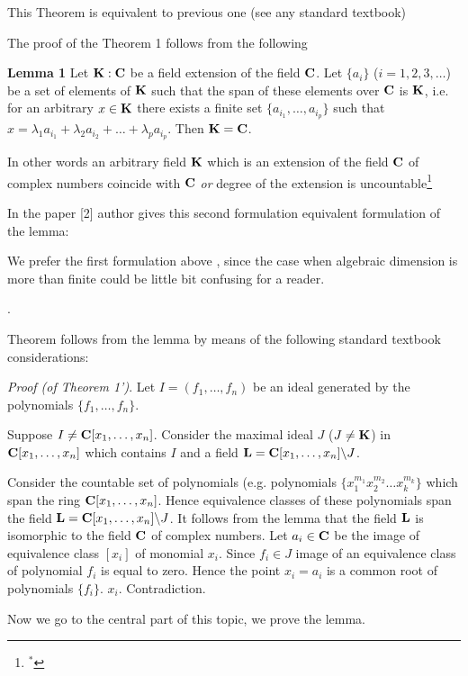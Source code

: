 \m

This Theorem is equivalent to previous one (see any standard textbook)

The proof of the Theorem 1 follows from the following

\m

{\bf Lemma 1}  Let ${\bf K}:{\bf C}$ be a field extension of the field ${\bf C}$. Let $\{a_i\}$ ($i=1,2,3,\dots$) be a set of
elements of ${\bf K}$ such that the span of these  elements over ${\bf C}$ is ${\bf K}$, i.e. for an arbitrary $x\in {\bf K}$
there exists a finite set $\{a_{i_1},\dots,a_{i_p}\}$ such that
$x=\lambda_1a_{i_1}+\lambda_2a_{i_2}+\dots+\lambda_pa_{i_p}$.
Then ${\bf K}={\bf C}$.

  In other words
 an arbitrary field $\bf K$ which is an extension of the field ${\bf C}$ of complex numbers coincide
 with ${\bf C}$ {\it or} degree of the extension is uncountable\footnote{$^*$}{In the paper [2] author gives this second formulation
equivalent formulation of the lemma:

\m

We  prefer the  first formulation above , since the case
when algebraic dimension is more than finite  could be little bit confusing for a reader.}.

\m

Theorem follows from the lemma by means of the following standard textbook considerations:



{\it Proof (of Theorem 1')}.
Let $I=(f_1,\dots,f_n)$ be an ideal generated by the polynomials $\{f_1,\dots,f_n\}$.

Suppose $I\not={\bf C}[x_1,\dots,x_n]$.
 Consider the maximal ideal $J$ ($J\not={\bf K}$) in ${\bf C}[x_1,\dots,x_n]$ which contains $I$
and a field ${\bf L}={\bf C}[x_1,\dots,x_n]\backslash J$.

Consider the countable set of polynomials  (e.g. polynomials $\{x_1^{m_1}x_2^{m_2}\dots x_k^{m_k}\}$
which span  the ring ${\bf C}[x_1,\dots,x_n]$. Hence equivalence classes of these polynomials
span the field  ${\bf L}={\bf C}[x_1,\dots,x_n]\backslash J$. It follows from the lemma that
  the field $\bf L$ is isomorphic to the field ${\bf C}$ of complex numbers. Let $a_i\in {\bf C}$ be the image
   of equivalence class $[x_i]$ of monomial $x_i$. Since $f_i\in J$ image of an equivalence class of
    polynomial $f_i$ is equal to zero. Hence the point $x_i=a_i$ is a common root of polynomials $\{f_i\}$.
  $x_i$. Contradiction.

  \m

  Now we go to the central part of this topic, we prove the lemma.

